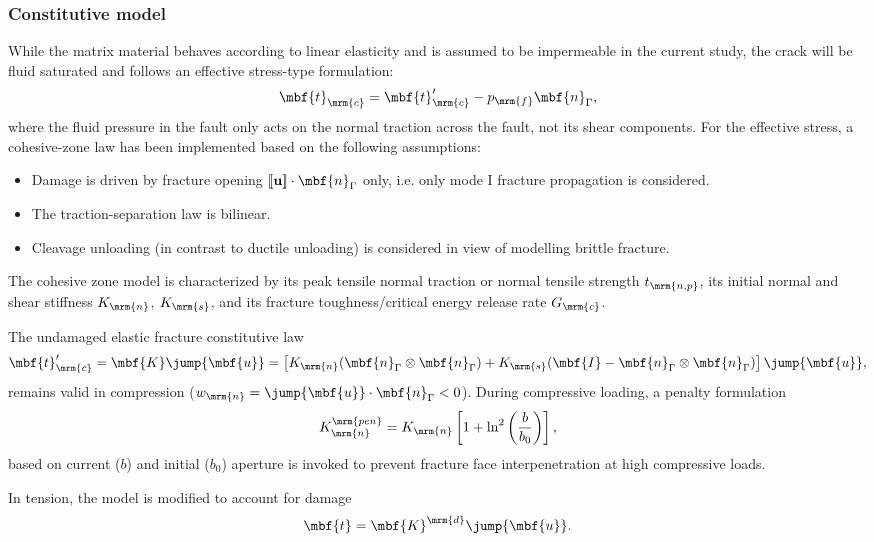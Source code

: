 \subsubsection*{Constitutive model}
While the matrix material behaves according to linear elasticity and is assumed to be impermeable in the current study, the crack will be fluid saturated and follows an effective stress-type formulation:
\begin{equation}
 	\mbf{t}_\mrm{c} = \mbf{t}'_\mrm{c} - p_\mrm{f} \mbf{n}_\Gamma,
 	\label{eq:effective_LIE}
\end{equation}
where the fluid pressure in the fault only acts on the normal traction across the fault, not its shear components. For the effective stress, a cohesive-zone law has been implemented based on the following assumptions:
\begin{itemize}
	\item Damage is driven by fracture opening $[\![\mathbf{u}]\!]\cdot\mbf{n}_\Gamma$ only, i.e. only mode I fracture propagation is considered.
	\item The traction-separation law is bilinear.
	\item Cleavage unloading (in contrast to ductile unloading) is considered in view of modelling brittle fracture. 
\end{itemize}

The cohesive zone model is characterized by its peak tensile normal traction or normal tensile strength $t_\mrm{n,p}$, its initial normal and shear stiffness $K_\mrm{n}$, $K_\mrm{s}$, and its fracture toughness/critical energy release rate $G_\mrm{c}$. 

The undamaged elastic fracture constitutive law 
\begin{equation}
	\mbf{t}'_\mrm{c} = \mbf{K} \jump{\mbf{u}} = \left[ K_\mrm{n} (\mbf{n}_\Gamma \otimes \mbf{n}_\Gamma) + K_\mrm{s} (\mbf{I} - \mbf{n}_\Gamma \otimes \mbf{n}_\Gamma) \right] \jump{\mbf{u}},
\end{equation}
remains valid in compression ($w_\mrm{n} = \jump{\mbf{u}} \cdot \mbf{n}_\Gamma < 0$). During compressive loading, a penalty formulation 
\begin{equation}
	K_\mrm{n}^\mrm{pen} = K_\mrm{n} \left[1 + \ln^2 \left( \frac{b}{b_0}\right) \right],
\end{equation}
based on current ($b$) and initial ($b_0$) aperture is invoked to prevent fracture face interpenetration at high compressive loads. 

In tension, the model is modified to account for damage
\begin{equation}
	\mbf{t} = \mbf{K}^\mrm{d} \jump{\mbf{u}}.
\end{equation}


